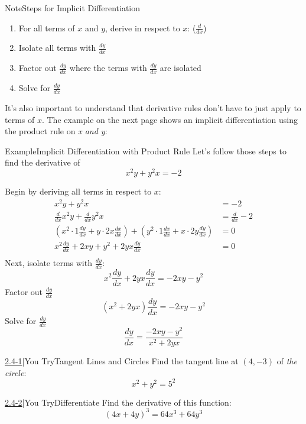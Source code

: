 \documentclass{MathNotes}
\newenvironment{example}[1]
{\begin{BlueBox}{Example}{#1}}{\end{BlueBox}}
\newenvironment{note}[1]
{\begin{YellowBox}{Note}{#1}}{\end{YellowBox}}
\newenvironment{practice}[2]
{\begin{PurpleBox}{\texorpdfstring{#1}\Big|You Try}{#2}}{\end{PurpleBox}}
\begin{document}
\begin{note}{Steps for Implicit Differentiation}
    \begin{enumerate}
        \item For all terms of $x$ and $y$, derive in respect to $x$:
            ($\frac{d}{dx}$) 
        \item Isolate all terms with $\frac{dy}{dx}$
        \item Factor out $\frac{dy}{dx}$ where the terms with $\frac{dy}{dx}$
            are isolated
        \item Solve for $\frac{dy}{dx}$
    \end{enumerate}
\end{note}
It's also important to understand that derivative rules don't have to just
apply to terms of $x$. The example on the next page shows an implicit
differentiation using the product rule on \textit{x and y}:
\begin{example}{Implicit Differentiation with Product Rule}
    Let's follow those steps to find the derivative of $$x^2y+y^2x=-2$$

    Begin by deriving all terms in respect to $x$:
    \begin{align*}
        x^2y+y^2x&=-2\\
        \frac{d}{dx}x^2y+\frac{d}{dx}y^2x&=\frac{d}{dx}-2\\
        (x^2\cdot 1\frac{dy}{dx}+y\cdot2x\frac{dx}{dx})
            +(y^2\cdot1\frac{dx}{dx}+x\cdot2y\frac{dy}{dx})&=0\\
        x^2\frac{dy}{dx}+2xy+y^2+2yx\frac{dy}{dx}&=0\\
    \end{align*}
    Next, isolate terms with $\frac{dy}{dx}$:
    $$x^2\frac{dy}{dx}+2yx\frac{dy}{dx}=-2xy-y^2$$
    Factor out $\frac{dy}{dx}$
    $$(x^2+2yx)\frac{dy}{dx}=-2xy-y^2$$
    Solve for $\frac{dy}{dx}$
    $$\frac{dy}{dx}=\frac{-2xy-y^2}{x^2+2yx}$$
\end{example}

\newpage
\begin{multicols}{2}
    \begin{practice}{\hyperref[ans:2.4-1]{2.4-1}}{Tangent Lines and Circles}
        \label{prac:2.4-1}
        Find the tangent line at $(4,-3)$ of \textit{the circle}:
        $$x^2+y^2=5^2$$
    \end{practice}
    \begin{practice}{\hyperref[ans:2.4-2]{2.4-2}}{Differentiate}\label{prac:2.4-2}
        Find the derivative of this function: $$(4x+4y)^3=64x^3+64y^3$$
    \end{practice}
\end{multicols}
\end{document}
